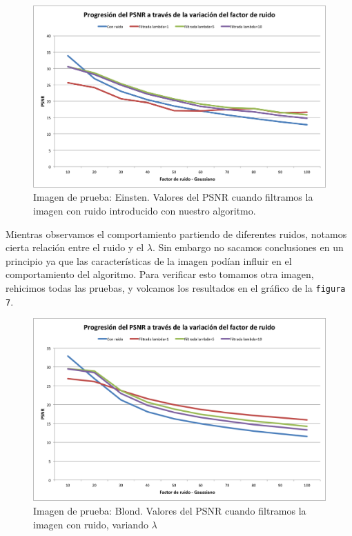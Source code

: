 \documentclass[a4paper]{article}
\begin{document}
\begin{figure}[H]
  \centering
  \includegraphics[scale=0.65]{graficos/PSNR_Einstein.png}
  \caption{ Imagen de prueba: Einsten. Valores del PSNR cuando filtramos la imagen con ruido introducido con nuestro algoritmo. }
\end{figure}

Mientras observamos el comportamiento partiendo de diferentes ruidos, notamos cierta relación entre el ruido y el $\lambda$. Sin embargo no sacamos conclusiones en un principio ya que las características de la imagen podían influir en el comportamiento del algoritmo. Para verificar esto tomamos otra imagen, rehicimos todas las pruebas, y volcamos los resultados en el gráfico de la \texttt{figura 7}. 

\begin{figure}[H]
  \centering
  \includegraphics[scale=0.65]{graficos/PSNR_Blond.png}
  \caption{ Imagen de prueba: Blond. Valores del PSNR cuando filtramos la imagen con ruido, variando $\lambda$}
\end{figure}
\end{document}
